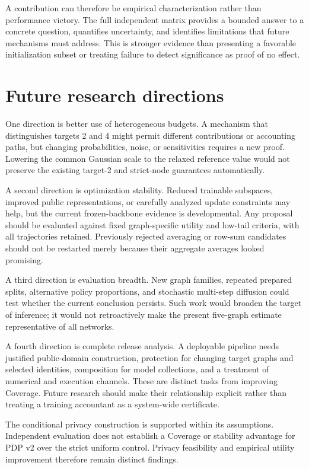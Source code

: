 A contribution can therefore be empirical characterization rather than performance victory. The full independent matrix provides a bounded answer to a concrete question, quantifies uncertainty, and identifies limitations that future mechanisms must address. This is stronger evidence than presenting a favorable initialization subset or treating failure to detect significance as proof of no effect.

\section{Future research directions}
One direction is better use of heterogeneous budgets. A mechanism that distinguishes targets 2 and 4 might permit different contributions or accounting paths, but changing probabilities, noise, or sensitivities requires a new proof. Lowering the common Gaussian scale to the relaxed reference value would not preserve the existing target-2 and strict-node guarantees automatically.

A second direction is optimization stability. Reduced trainable subspaces, improved public representations, or carefully analyzed update constraints may help, but the current frozen-backbone evidence is developmental. Any proposal should be evaluated against fixed graph-specific utility and low-tail criteria, with all trajectories retained. Previously rejected averaging or row-sum candidates should not be restarted merely because their aggregate averages looked promising.

A third direction is evaluation breadth. New graph families, repeated prepared splits, alternative policy proportions, and stochastic multi-step diffusion could test whether the current conclusion persists. Such work would broaden the target of inference; it would not retroactively make the present five-graph estimate representative of all networks.

A fourth direction is complete release analysis. A deployable pipeline needs justified public-domain construction, protection for changing target graphs and selected identities, composition for model collections, and a treatment of numerical and execution channels. These are distinct tasks from improving Coverage. Future research should make their relationship explicit rather than treating a training accountant as a system-wide certificate.

The conditional privacy construction is supported within its assumptions. Independent evaluation does not establish a Coverage or stability advantage for PDP v2 over the strict uniform control. Privacy feasibility and empirical utility improvement therefore remain distinct findings.
